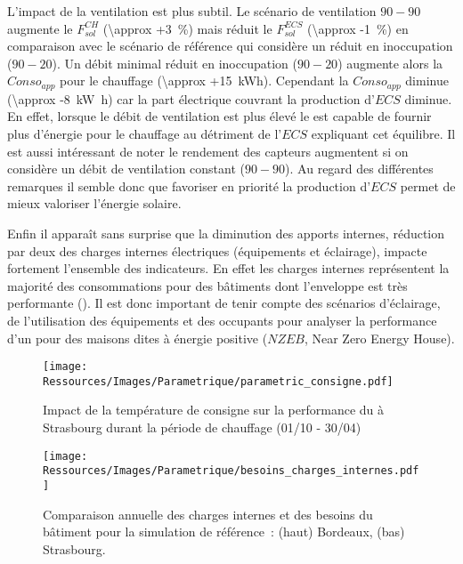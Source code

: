 L’impact de la ventilation est plus subtil. Le scénario de ventilation $90-90$
augmente le $F_{sol}^{CH}$ (\SI{\approx +3}{\percent}) mais réduit le $F_{sol}^{ECS}$
(\SI{\approx -1}{\percent}) en comparaison avec le scénario de référence qui considère un
réduit en inoccupation ($90-20$). Un débit minimal réduit en inoccupation ($90-20$) augmente
alors la $Conso_{app}$ pour le chauffage (\SI{\approx +15}{kWh}). Cependant la
$Conso_{app}$ diminue (\SI{\approx -8}{\kilo\watt\hour}) car la part
électrique couvrant la production d’$ECS$ diminue. En effet, lorsque le débit de ventilation
est plus élevé le  est capable de fournir plus d’énergie pour le chauffage au
détriment de l’$ECS$ expliquant cet équilibre. Il est aussi intéressant de noter le
rendement des capteurs augmentent si on considère un débit de ventilation constant
($90-90$). Au regard des différentes remarques il semble donc que
favoriser en priorité la production d’$ECS$ permet de mieux valoriser l’énergie solaire.

Enfin il apparaît sans surprise que la diminution des apports internes, réduction par deux
des charges internes électriques (équipements et éclairage), impacte fortement l’ensemble
des indicateurs. En effet les charges internes représentent la majorité des consommations
pour des bâtiments dont l’enveloppe est très performante ().
Il est donc important de tenir compte des scénarios d’éclairage, de l’utilisation des
équipements et des occupants pour analyser la performance d’un  pour des maisons
dites à énergie positive ($NZEB$, Near Zero Energy House).

\begin{figure}
    \centering
    \texttt{[image: Ressources/Images/Parametrique/parametric\_consigne.pdf]}
    \caption{Impact de la température de consigne sur la performance
             du  à Strasbourg durant la période de chauffage (01/10 - 30/04)}
    \label{fig:impact_temp_consigne}
\end{figure}

\begin{figure}
    \centering
    \texttt{[image: Ressources/Images/Parametrique/besoins\_charges\_internes.pdf]}
    \caption{Comparaison annuelle des charges internes et des besoins du bâtiment
             pour la simulation de référence~: (haut) Bordeaux, (bas) Strasbourg.}
    \label{fig:besoins_charges_internes}
\end{figure}


